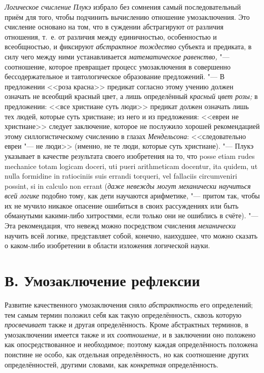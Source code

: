 {\em Логическое счисление Плукэ}
избрало без сомнения самый последовательный приём для того,
чтобы подчинить вычислению отношение умозаключения. Это счисление основано
на том, что в суждении абстрагируют от различия отношения, т.~е. от
различия между единичностью, особенностью и всеобщностью, и фиксируют
{\em абстрактное тождество}
субъекта и предиката, в силу чего между ними устанавливается
{\em математическое равенство,} "---
соотношение, которое превращает процесс умозаключения в
совершенно бессодержательное и тавтологическое образование предложений. "---
В предложении <<роза красна>> предикат согласно этому учению
должен означать не всеобщий красный цвет, а лишь определённый
{\em красный цвет розы;}
в предложении: <<все христиане суть люди>> предикат должен
означать лишь тех людей, которые суть христиане; из него и из предложения:
<<евреи не христиане>> следует заключение, которое не послужило хорошей
рекомендацией этому силлогистическому счислению в глазах
{\em Мендельсона}:
<<следовательно евреи "--- не люди>> (именно, не те
люди, которые суть христиане). "--- Плукэ указывает в качестве
результата своего изобретения на то, что posse etiam rudes mechanice totam
logicam doceri, uti pueri arithme\-ticam docentur, ita quidem, ut nulla
formidine in ratiociniis suis errandi torqueri, vel fallaciis circum\-veniri
possint, si in calculo non errant
({\em даже невежды могут механически
научиться всей логике} подобно тому, как дети научаются
арифметике, "--- притом так, чтобы их не мучило никакое
опасение ошибиться в своих рассуждениях или быть обманутыми какими-либо
хитростями, если только они не ошиблись в счёте). "--- Эта
рекомендация, что невежд можно посредством счисления
{\em механически} научить
всей логике, представляет собой, конечно, наихудшее, что
можно сказать о каком-либо изобретении в области изложения логической
науки.

\section[В. Умозаключение рефлексии]{В. Умозаключение рефлексии}

Развитие качественного умозаключения сняло
{\em абстрактность} его
определений; тем самым термин положил себя как такую определённость, сквозь
которую {\em просвечивает}
также и другая определённость. Кроме абстрактных терминов, в
умозаключении имеется также и их
{\em соотношение,} и в
заключении оно положено как опосредствованное и необходимое; поэтому каждая
определённость положена поистине не особо, как отдельная определённость, но
как соотношение других определённостей, другими словами, как
{\em конкретная} определённость.

